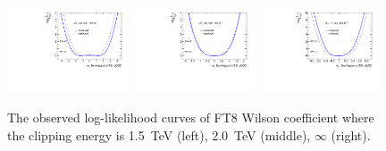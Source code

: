 \begin{figure}[ht]
    \centering
    \includegraphics[width=0.32\textwidth]{figures/aQGC/profileFT81500}
    	\includegraphics[width=0.32\textwidth]{figures/aQGC/profileFT82000}
        \includegraphics[width=0.32\textwidth]{figures/aQGC/profileFT8inf}
        \caption{The observed log-likelihood curves of FT8 Wilson coefficient where the clipping energy is 1.5~TeV (left), 2.0~TeV (middle), $\infty$ (right).}
        \label{fig:ProfileLL}
\end{figure}


